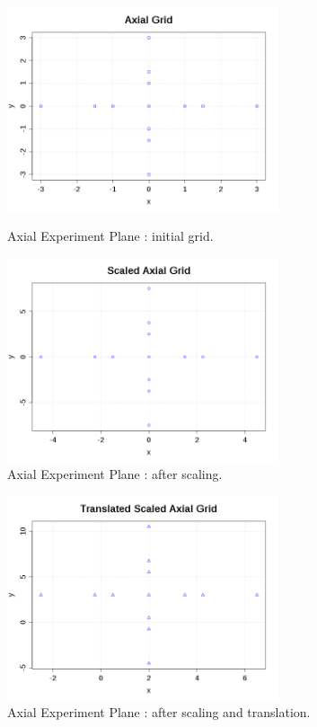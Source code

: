 \begin{figure}[H]
  \begin{minipage}{10cm}
    \begin{center}
      \includegraphics[width=8cm]{AxialGrid.png}
      \caption{Axial Experiment Plane : initial grid.}
      \label{AxialGrid}
    \end{center}
  \end{minipage}
  \hfill
  \begin{minipage}{10cm}
    \begin{center}
      \includegraphics[width=8cm]{ScaledAxialGrid.png}
      \caption{Axial Experiment Plane : after scaling.}
      \label{ScaledAxialGrid}
    \end{center}
  \end{minipage}
\end{figure}

\begin{figure}[H]
  \begin{center}
    \includegraphics[width=8cm]{TranslatedScaledAxialGrid.png}
  \end{center}
  \caption{Axial Experiment Plane : after scaling and translation.}
  \label{TranslatedScaledAxialGrid}
\end{figure}



